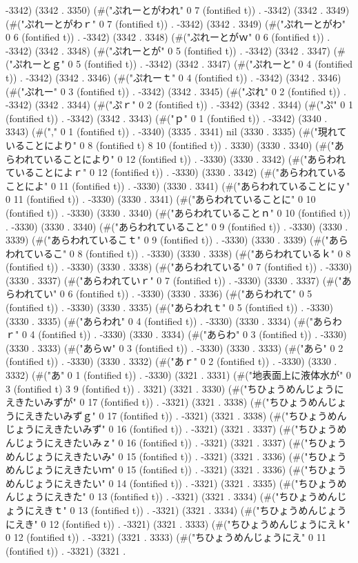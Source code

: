-3342) (3342 . 3350) (#("ぷれーとがわれ" 0 7 (fontified t)) . -3342) (3342 . 3349) (#("ぷれーとがわｒ" 0 7 (fontified t)) . -3342) (3342 . 3349) (#("ぷれーとがわ" 0 6 (fontified t)) . -3342) (3342 . 3348) (#("ぷれーとがｗ" 0 6 (fontified t)) . -3342) (3342 . 3348) (#("ぷれーとが" 0 5 (fontified t)) . -3342) (3342 . 3347) (#("ぷれーとｇ" 0 5 (fontified t)) . -3342) (3342 . 3347) (#("ぷれーと" 0 4 (fontified t)) . -3342) (3342 . 3346) (#("ぷれーｔ" 0 4 (fontified t)) . -3342) (3342 . 3346) (#("ぷれー" 0 3 (fontified t)) . -3342) (3342 . 3345) (#("ぷれ" 0 2 (fontified t)) . -3342) (3342 . 3344) (#("ぷｒ" 0 2 (fontified t)) . -3342) (3342 . 3344) (#("ぷ" 0 1 (fontified t)) . -3342) (3342 . 3343) (#("ｐ" 0 1 (fontified t)) . -3342) (3340 . 3343) (#("," 0 1 (fontified t)) . -3340) (3335 . 3341) nil (3330 . 3335) (#("現れていることにより" 0 8 (fontified t) 8 10 (fontified t)) . 3330) (3330 . 3340) (#("あらわれていることにより" 0 12 (fontified t)) . -3330) (3330 . 3342) (#("あらわれていることによｒ" 0 12 (fontified t)) . -3330) (3330 . 3342) (#("あらわれていることによ" 0 11 (fontified t)) . -3330) (3330 . 3341) (#("あらわれていることにｙ" 0 11 (fontified t)) . -3330) (3330 . 3341) (#("あらわれていることに" 0 10 (fontified t)) . -3330) (3330 . 3340) (#("あらわれていることｎ" 0 10 (fontified t)) . -3330) (3330 . 3340) (#("あらわれていること" 0 9 (fontified t)) . -3330) (3330 . 3339) (#("あらわれているこｔ" 0 9 (fontified t)) . -3330) (3330 . 3339) (#("あらわれているこ" 0 8 (fontified t)) . -3330) (3330 . 3338) (#("あらわれているｋ" 0 8 (fontified t)) . -3330) (3330 . 3338) (#("あらわれている" 0 7 (fontified t)) . -3330) (3330 . 3337) (#("あらわれていｒ" 0 7 (fontified t)) . -3330) (3330 . 3337) (#("あらわれてい" 0 6 (fontified t)) . -3330) (3330 . 3336) (#("あらわれて" 0 5 (fontified t)) . -3330) (3330 . 3335) (#("あらわれｔ" 0 5 (fontified t)) . -3330) (3330 . 3335) (#("あらわれ" 0 4 (fontified t)) . -3330) (3330 . 3334) (#("あらわｒ" 0 4 (fontified t)) . -3330) (3330 . 3334) (#("あらわ" 0 3 (fontified t)) . -3330) (3330 . 3333) (#("あらｗ" 0 3 (fontified t)) . -3330) (3330 . 3333) (#("あら" 0 2 (fontified t)) . -3330) (3330 . 3332) (#("あｒ" 0 2 (fontified t)) . -3330) (3330 . 3332) (#("あ" 0 1 (fontified t)) . -3330) (3321 . 3331) (#("地表面上に液体水が" 0 3 (fontified t) 3 9 (fontified t)) . 3321) (3321 . 3330) (#("ちひょうめんじょうにえきたいみずが" 0 17 (fontified t)) . -3321) (3321 . 3338) (#("ちひょうめんじょうにえきたいみずｇ" 0 17 (fontified t)) . -3321) (3321 . 3338) (#("ちひょうめんじょうにえきたいみず" 0 16 (fontified t)) . -3321) (3321 . 3337) (#("ちひょうめんじょうにえきたいみｚ" 0 16 (fontified t)) . -3321) (3321 . 3337) (#("ちひょうめんじょうにえきたいみ" 0 15 (fontified t)) . -3321) (3321 . 3336) (#("ちひょうめんじょうにえきたいｍ" 0 15 (fontified t)) . -3321) (3321 . 3336) (#("ちひょうめんじょうにえきたい" 0 14 (fontified t)) . -3321) (3321 . 3335) (#("ちひょうめんじょうにえきた" 0 13 (fontified t)) . -3321) (3321 . 3334) (#("ちひょうめんじょうにえきｔ" 0 13 (fontified t)) . -3321) (3321 . 3334) (#("ちひょうめんじょうにえき" 0 12 (fontified t)) . -3321) (3321 . 3333) (#("ちひょうめんじょうにえｋ" 0 12 (fontified t)) . -3321) (3321 . 3333) (#("ちひょうめんじょうにえ" 0 11 (fontified t)) . -3321) (3321 . 
